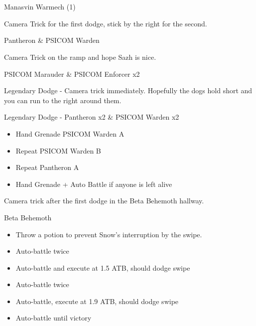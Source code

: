 \chapter[Chapter 1]{}

	\begin{battle}{Manasvin Warmech (1)}
	\end{battle}

	Camera Trick for the first dodge, stick by the right for the second.

	\begin{battle}{Pantheron \& PSICOM Warden}
	\end{battle}

	Camera Trick on the ramp and hope Sazh is nice.

	\begin{battle}{PSICOM Marauder \& PSICOM Enforcer x2}
	\end{battle}

	Legendary Dodge - Camera trick immediately. Hopefully the dogs hold short and you can run to the right around them.

	\begin{battle}{Legendary Dodge - Pantheron x2 \& PSICOM Warden x2}
		\begin{itemize}
			\item Hand Grenade PSICOM Warden A
			\item Repeat PSICOM Warden B
			\item Repeat Pantheron A
			\item Hand Grenade + Auto Battle if anyone is left alive
		\end{itemize}

	\end{battle}

	Camera trick after the first dodge in the Beta Behemoth hallway.

	\begin{battle}{Beta Behemoth}
		\begin{itemize}
			\item Throw a potion to prevent Snow's interruption by the swipe.
			\item Auto-battle twice
			\item Auto-battle and execute at 1.5 ATB, should dodge swipe
			\item Auto-battle twice
			\item Auto-battle, execute at 1.9 ATB, should dodge swipe
			\item Auto-battle until victory
		\end{itemize}
	\end{battle}

